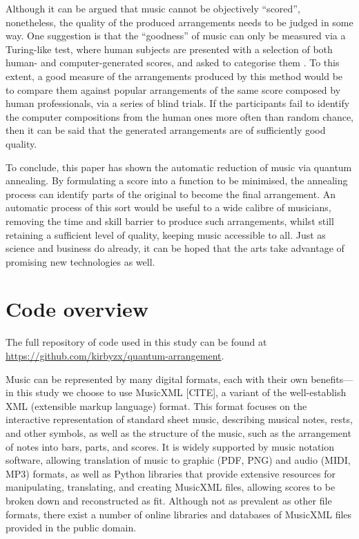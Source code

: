 \documentclass[12pt]{article}
\theoremstyle{definition}
\begin{document}
Although it can be argued that music cannot be objectively ``scored'', nonetheless, the quality of the produced arrangements needs to be judged in some way. One suggestion is that the ``goodness'' of music can only be measured via a Turing-like test, where human subjects are presented with a selection of both human- and computer-generated scores, and asked to categorise them . To this extent, a good measure of the arrangements produced by this method would be to compare them against popular arrangements of the same score composed by human professionals, via a series of blind trials. If the participants fail to identify the computer compositions from the human ones more often than random chance, then it can be said that the generated arrangements are of sufficiently good quality.

To conclude, this paper has shown the automatic reduction of music via quantum annealing. By formulating a score into a function to be minimised, the annealing process can identify parts of the original to become the final arrangement. An automatic process of this sort would be useful to a wide calibre of musicians, removing the time and skill barrier to produce such arrangements, whilst still retaining a sufficient level of quality, keeping music accessible to all. Just as science and business do already, it can be hoped that the arts take advantage of promising new technologies as well.

\printbibliography[heading=bibintoc]

\clearpage
\appendix

\section{Code overview}
\label{app:code}

The full repository of code used in this study can be found at \url{https://github.com/kirbyzx/quantum-arrangement}.

Music can be represented by many digital formats, each with their own benefits---in this study we choose to use MusicXML [CITE], a variant of the well-establish XML (extensible markup language) format. This format focuses on the interactive representation of standard sheet music, describing musical notes, rests, and other symbols, as well as the structure of the music, such as the arrangement of notes into bars, parts, and scores. It is widely supported by music notation software, allowing translation of music to graphic (PDF, PNG) and audio (MIDI, MP3) formats, as well as Python libraries that provide extensive resources for manipulating, translating, and creating MusicXML files, allowing scores to be broken down and reconstructed as fit. Although not as prevalent as other file formats, there exist a number of online libraries and databases of MusicXML files provided in the public domain.
\end{document}
